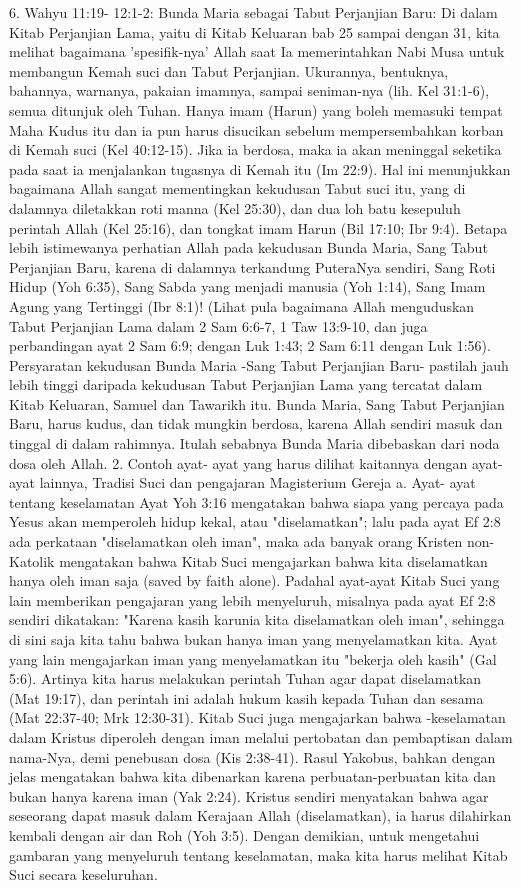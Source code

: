 6.    Wahyu 11:19- 12:1-2: Bunda Maria sebagai Tabut Perjanjian Baru: Di dalam Kitab Perjanjian Lama, yaitu di Kitab Keluaran bab 25 sampai dengan 31, kita melihat bagaimana ’spesifik-nya’ Allah saat Ia memerintahkan Nabi Musa untuk membangun Kemah suci dan Tabut Perjanjian. Ukurannya, bentuknya, bahannya, warnanya, pakaian imamnya, sampai seniman-nya (lih. Kel 31:1-6), semua ditunjuk oleh Tuhan. Hanya imam (Harun) yang boleh memasuki tempat Maha Kudus itu dan ia pun harus disucikan sebelum mempersembahkan korban di Kemah suci (Kel 40:12-15). Jika ia berdosa, maka ia akan meninggal seketika pada saat ia menjalankan tugasnya di Kemah itu (Im 22:9). Hal ini menunjukkan bagaimana Allah sangat mementingkan kekudusan Tabut suci itu, yang di dalamnya diletakkan roti manna (Kel 25:30), dan dua loh batu kesepuluh perintah Allah (Kel 25:16), dan tongkat imam Harun (Bil 17:10; Ibr 9:4). Betapa lebih istimewanya perhatian Allah pada kekudusan Bunda Maria, Sang Tabut Perjanjian Baru, karena di dalamnya terkandung PuteraNya sendiri, Sang Roti Hidup (Yoh 6:35), Sang Sabda yang menjadi manusia (Yoh 1:14), Sang Imam Agung yang Tertinggi (Ibr 8:1)! (Lihat pula bagaimana Allah menguduskan Tabut Perjanjian Lama dalam 2 Sam 6:6-7, 1 Taw 13:9-10, dan juga perbandingan ayat 2 Sam 6:9; dengan Luk 1:43; 2 Sam 6:11 dengan Luk 1:56). Persyaratan kekudusan Bunda Maria -Sang Tabut Perjanjian Baru- pastilah jauh lebih tinggi daripada kekudusan Tabut Perjanjian Lama yang tercatat dalam Kitab Keluaran, Samuel dan Tawarikh itu. Bunda Maria, Sang Tabut Perjanjian Baru, harus kudus, dan tidak mungkin berdosa, karena Allah sendiri masuk dan tinggal di dalam rahimnya. Itulah sebabnya Bunda Maria dibebaskan dari noda dosa oleh Allah.
2. Contoh ayat- ayat yang harus dilihat kaitannya dengan ayat- ayat lainnya, Tradisi Suci dan pengajaran Magisterium Gereja
a. Ayat- ayat tentang keselamatan
Ayat Yoh 3:16 mengatakan bahwa siapa yang percaya pada Yesus akan memperoleh hidup kekal, atau "diselamatkan"; lalu pada ayat Ef 2:8 ada perkataan "diselamatkan oleh iman", maka ada banyak orang Kristen non- Katolik mengatakan bahwa Kitab Suci mengajarkan bahwa kita diselamatkan hanya oleh iman saja (saved by faith alone). Padahal ayat-ayat Kitab Suci yang lain memberikan pengajaran yang lebih menyeluruh, misalnya pada ayat Ef 2:8 sendiri dikatakan: "Karena kasih karunia kita diselamatkan oleh iman", sehingga di sini saja kita tahu bahwa bukan hanya iman yang menyelamatkan kita. Ayat yang lain mengajarkan iman yang menyelamatkan itu "bekerja oleh kasih" (Gal 5:6). Artinya kita harus melakukan perintah Tuhan agar dapat diselamatkan (Mat 19:17), dan perintah ini adalah hukum kasih kepada Tuhan dan sesama (Mat 22:37-40; Mrk 12:30-31). Kitab Suci juga mengajarkan bahwa -keselamatan dalam Kristus diperoleh dengan iman melalui pertobatan dan pembaptisan dalam nama-Nya, demi penebusan dosa (Kis 2:38-41). Rasul Yakobus, bahkan dengan jelas mengatakan bahwa kita dibenarkan karena perbuatan-perbuatan kita dan bukan hanya karena iman (Yak 2:24). Kristus sendiri menyatakan bahwa agar seseorang dapat masuk dalam Kerajaan Allah (diselamatkan), ia harus dilahirkan kembali dengan air dan Roh (Yoh 3:5). Dengan demikian, untuk mengetahui gambaran yang menyeluruh tentang keselamatan, maka kita harus melihat Kitab Suci secara keseluruhan.
